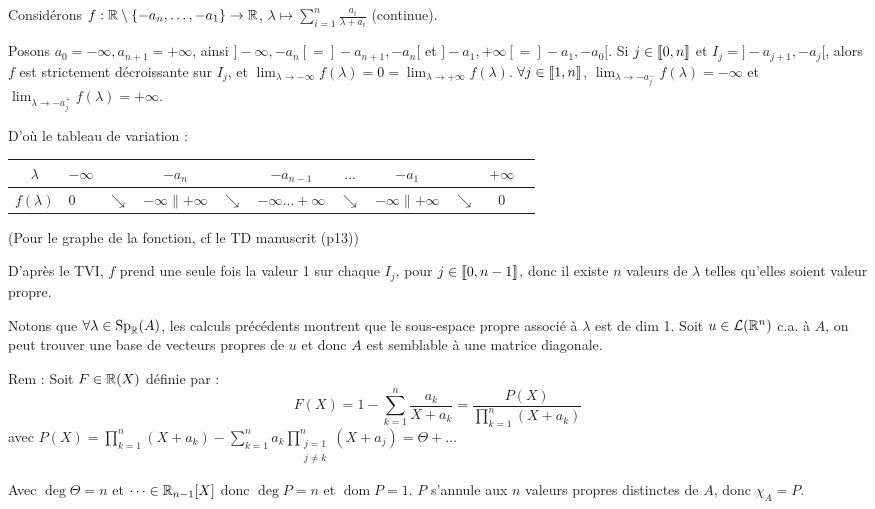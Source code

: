 \begin{solution}
Considérons $f : \mathbb R \setminus \{-a_n, \dots, -a_1\} \to \mathbb R$, $\lambda \mapsto \sum_{i=1}^n \frac{a_i}{\lambda + a_i}$ (continue).

Posons $a_0 = -\infty, a_{n+1} = +\infty$, ainsi $]-\infty, -a_n[ = ]-a_{n+1}, -a_n[$ et $]-a_1, +\infty[ = ]-a_1, -a_0[$.
Si $j \in \llbracket 0,n\rrbracket$ et $I_j = ]-a_{j+1}, -a_j[$, alors $f$ est strictement décroissante sur $I_j$,
et $\lim_{\lambda \to -\infty} f(\lambda) = 0 = \lim_{\lambda \to +\infty} f(\lambda)$.
$\forall j \in \llbracket 1,n\rrbracket$, $\lim_{\lambda \to -a_j^-} f(\lambda) = -\infty$ et $\lim_{\lambda \to -a_j^+} f(\lambda) = +\infty$.

D'où le tableau de variation :
\begin{center}
\begin{tabular}{|c|lccccccccr|}
\hline
$\lambda$ & $-\infty$ & & $-a_n$ & & $-a_{n-1}$ & $\dots$ & $-a_1$ & & $+\infty$ \\
\hline
$f(\lambda)$ & $0$ & $\searrow$ & $-\infty \parallel +\infty$ & $\searrow$ & $-\infty \dots +\infty$ & $\searrow$ & $-\infty \parallel +\infty$ & $\searrow$ & $0$ \\
\hline
\end{tabular}
\end{center}

(Pour le graphe de la fonction, cf le TD manuscrit (p13))

D'après le TVI, $f$ prend une seule fois la valeur 1 sur chaque $I_j$, pour $j \in \llbracket 0,n-1\rrbracket$, donc il existe $n$ valeurs de $\lambda$ telles qu'elles soient valeur propre.

Notons que $\forall \lambda \in \operatorname{Sp}_\mathbb R(A)$, les calculs précédents montrent que le sous-espace propre associé à $\lambda$ est de dim 1.
Soit $u \in \mathcal L(\mathbb R^n)$ c.a. à $A$, on peut trouver une base de vecteurs propres de $u$ et donc $A$ est semblable à une matrice diagonale.

\begin{remarkbox}
Rem : Soit $F \in \mathbb R(X)$ définie par :
\[
F(X) = 1 - \sum_{k=1}^n \frac{a_k}{X + a_k} = \frac{P(X)}{\prod_{k=1}^n (X + a_k)}
\]
avec $P(X) = \prod_{k=1}^n (X + a_k) - \sum_{k=1}^n a_k \prod_{\substack{j=1\\j \neq k}}^n (X + a_j) = \Theta + \dots$ %

Avec $\deg \Theta = n$ et $\dots \in \mathbb R_{n-1}[X]$
donc $\deg P = n$ et $\operatorname{dom} P = 1$.
$P$ s'annule aux $n$ valeurs propres distinctes de $A$, donc $\boxed{\chi_A = P}$.
\end{remarkbox}
\end{solution}

